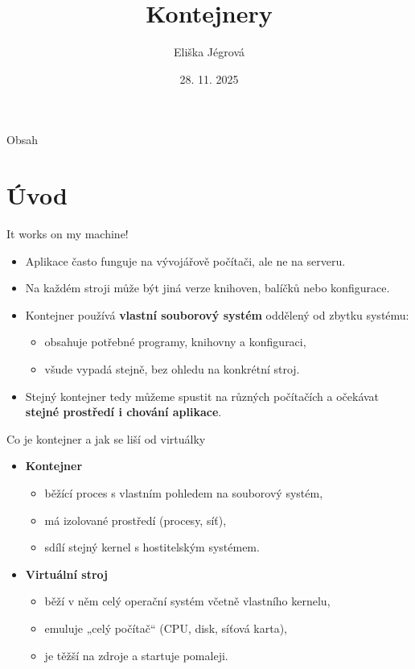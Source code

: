 \documentclass{beamer}
\title{Kontejnery}
\author{Eliška Jégrová}
\date{28. 11. 2025}
\begin{document}
	
	\frame{\titlepage}
	
	\begin{frame}{Obsah}
		\tableofcontents
	\end{frame}

\section{Úvod}

\begin{frame}{It works on my machine!}
	\begin{itemize}
		\item Aplikace často funguje na vývojářově počítači, ale ne na serveru.
		\item Na každém stroji může být jiná verze knihoven, balíčků nebo konfigurace.
		\item Kontejner používá \textbf{vlastní souborový systém} oddělený od zbytku systému:
		\begin{itemize}
			\item obsahuje potřebné programy, knihovny a konfiguraci,
			\item všude vypadá stejně, bez ohledu na konkrétní stroj.
		\end{itemize}
		\item Stejný kontejner tedy můžeme spustit na různých počítačích
		a očekávat \textbf{stejné prostředí i chování aplikace}.
	\end{itemize}
\end{frame}

\begin{frame}{Co je kontejner a jak se liší od virtuálky}
	\begin{itemize}
		\item \textbf{Kontejner}
		\begin{itemize}
			\item běžící proces s vlastním pohledem na souborový systém,
			\item má izolované prostředí (procesy, síť),
			\item sdílí stejný kernel s hostitelským systémem.
		\end{itemize}
		
		\item \textbf{Virtuální stroj}
		\begin{itemize}
			\item běží v něm celý operační systém včetně vlastního kernelu,
			\item emuluje „celý počítač“ (CPU, disk, síťová karta),
			\item je těžší na zdroje a startuje pomaleji.
		\end{itemize}
		
	\end{itemize}
\end{frame}
\end{document}
